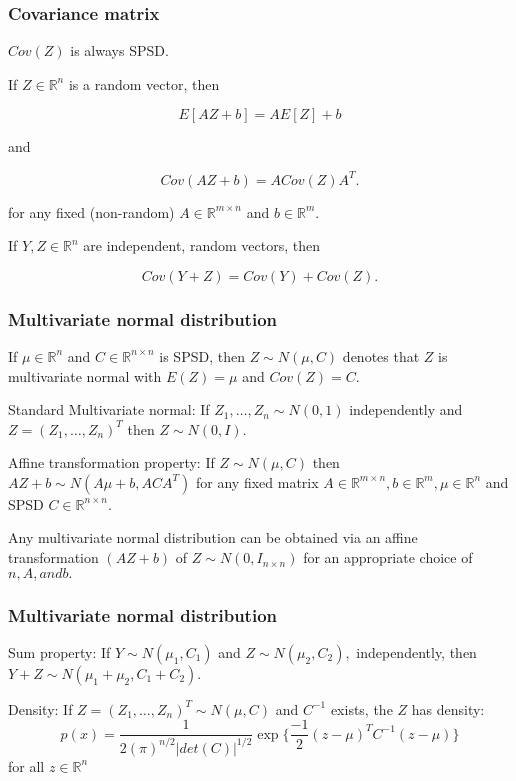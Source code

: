\documentclass[mathserif]{beamer}
\begin{document}
\begin{frame}
\frametitle{Covariance matrix}

$Cov(Z)$ is always SPSD. 

\vspace*{1em}

If $Z \in \mathbb{R}^{n}$ is a random vector, then 

$$E[AZ + b] = A E[Z] + b$$

and 

$$Cov(AZ + b) = A Cov(Z) A^T.$$

for any fixed (non-random) $A \in \mathbb{R}^{m \times n}$  and $b  \in \mathbb{R}^{m}.$ 

If $Y, Z  \in \mathbb{R}^{n}$ are independent, random vectors, then 

$$Cov(Y + Z) = Cov(Y) + Cov(Z).$$

\end{frame}

\begin{frame}
\frametitle{Multivariate normal distribution}

If $\mu \in \mathbb{R}^n$ and $C \in \mathbb{R}^{n \times n}$ is SPSD, then $Z \sim N(\mu, C)$ denotes 
that $Z$ is multivariate normal with $E(Z) = \mu$ and $Cov(Z) = C.$

\vspace*{1em}

Standard Multivariate normal: If $Z_1, \ldots, Z_n \sim N(0, 1)$ independently and $Z = (Z_1, \ldots, Z_n)^T$ then 
$Z \sim N(0, I).$

\vspace*{1em}

Affine transformation property: If $Z \sim N(\mu, C)$ then $AZ + b \sim N(A\mu + b, ACA^T)$ for any fixed matrix $A \in 
\mathbb{R}^{m \times n}, b \in \mathbb{R}^m, \mu \in \mathbb{R}^n$ and SPSD $C \in \mathbb{R}^{n \times n}.$

\vspace*{1em}

Any multivariate normal distribution can be obtained via an
affine transformation $(AZ + b)$ of $Z \sim N(0, I_{n \times n})$ for an appropriate choice of $n, A, and b.$
\end{frame}


\begin{frame}
\frametitle{Multivariate normal distribution}

Sum property: If $Y \sim N(\mu_1, C_1)$ and $Z \sim N(\mu_2, C_2),$ independently, then $Y+Z \sim N(\mu_1 + \mu_2, C_1 + C_2).$

\vspace*{1em}

Density: If $Z = (Z_1, \ldots, Z_n)^T \sim N(\mu, C)$ and $C^{-1}$ exists, the $Z$ has density:
$$p(x) = \frac{1}{
2(\pi)^{n/2} 
| det(C)|^{1/2}
}
\exp\{
\frac{-1}{2} (z - \mu)^T C^{-1} (z - \mu)
\}
$$
for all $z \in \mathbb{R}^n$
\end{frame}
\end{document}
